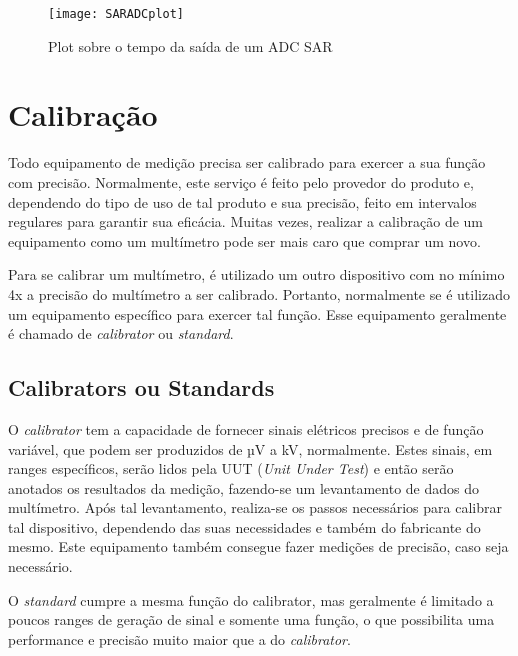     \begin{figure}[htb]%
        \caption{Plot sobre o tempo da saída de um ADC SAR}%
        \label{fig:SARADCplot}%
        \texttt{[image: SARADCplot]}%
    \end{figure} 


\section{Calibração}\label{sec:Calibration}

Todo equipamento de medição precisa ser calibrado para exercer a sua função com precisão. Normalmente, este serviço é feito pelo provedor do produto e, dependendo do tipo de uso de tal produto e sua precisão, feito em intervalos regulares para garantir sua eficácia. Muitas vezes, realizar a calibração de um equipamento como um multímetro pode ser mais caro que comprar um novo.

Para se calibrar um multímetro, é utilizado um outro dispositivo com no mínimo 4x a precisão do multímetro a ser calibrado. Portanto, normalmente se é utilizado um equipamento específico para exercer tal função. Esse equipamento geralmente é chamado de \textit{calibrator} ou \textit{standard}. %

    \subsection{Calibrators ou Standards}\label{subsec:Calibrators}

    O \textit{calibrator} tem a capacidade de fornecer sinais elétricos precisos e de função variável, que podem ser produzidos de µV a kV, normalmente. Estes sinais, em ranges específicos, serão lidos pela \gls{UUT} (\textit{Unit Under Test}) e então serão anotados os resultados da medição, fazendo-se um levantamento de dados do multímetro. Após tal levantamento, realiza-se os passos necessários para calibrar tal dispositivo, dependendo das suas necessidades e também do fabricante do mesmo. Este equipamento também consegue fazer medições de precisão, caso seja necessário. 

    O \textit{standard} cumpre a mesma função do calibrator, mas geralmente é limitado a poucos ranges de geração de sinal e somente uma função, o que possibilita uma performance e precisão muito maior que a do \textit{calibrator}. 

